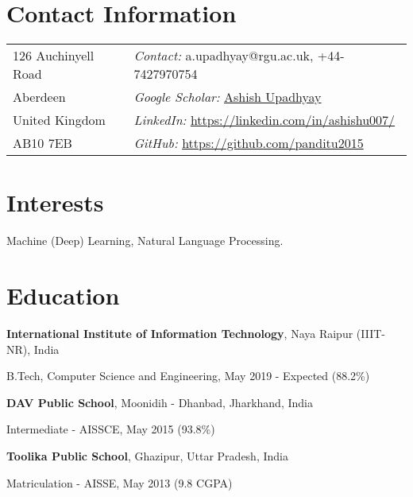 \documentclass[margin,line]{res}
\newenvironment{list1}{
  \begin{list}{\ding{113}}{%
      \setlength{\itemsep}{0in}
      \setlength{\parsep}{0in} \setlength{\parskip}{0in}
      \setlength{\topsep}{0in} \setlength{\partopsep}{0in} 
      \setlength{\leftmargin}{0.17in}}}{\end{list}}
\begin{document}

\begin{resume}
\vspace{-0.1in}
\section{\sc Contact Information}
\begin{tabular}{@{}p{2in}p{3in}}          
126 Auchinyell Road   & {\it Contact:} a.upadhyay@rgu.ac.uk, +44-7427970754 \\         
Aberdeen & {\it Google Scholar:} {\href{https://scholar.google.co.in/citations?view_op=list_works&hl=en&user=aUwP8DAAAAAJ}{Ashish Upadhyay}}\\       
United Kingdom & {\it LinkedIn:} {\href{https://www.linkedin.com/in/ashishu007/}{https://linkedin.com/in/ashishu007/}} \\     
AB10 7EB  & {\it GitHub: }\href{https://github.com/panditu2015}{https://github.com/panditu2015} \\     
\end{tabular}

\vspace{-0.1in}
\section{\sc Interests}
Machine (Deep) Learning, Natural Language Processing.

\vspace{-0.1in}
\section{\sc Education}
{\bf International Institute of Information Technology}, Naya Raipur (IIIT-NR), India
\begin{list1}
\item[] B.Tech, Computer Science and Engineering, May 2019 - Expected (88.2\%)
\end{list1}
\vspace{-0.1in}
{\bf DAV Public School}, Moonidih - Dhanbad, Jharkhand, India\\
\vspace*{-.5cm}
\begin{list1}
\item[] Intermediate - AISSCE, May 2015 (93.8\%)
\end{list1}
\vspace{-0.1in}
{\bf Toolika Public School}, Ghazipur, Uttar Pradesh, India\\
\vspace*{-.5cm}
\begin{list1}
\item[] Matriculation - AISSE, May 2013 (9.8 CGPA)
\end{list1}


\end{resume}
\end{document}
